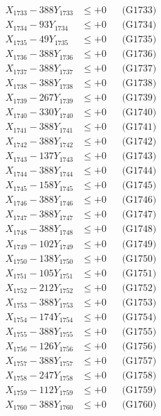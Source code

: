 \documentclass[a4paper,10pt]{article}
\begin{document}
{\begin{align}
X_{1733} - 388Y_{1733} &\leq +0 && \text{(G1733)} \\
X_{1734} - 93Y_{1734} &\leq +0 && \text{(G1734)} \\
X_{1735} - 49Y_{1735} &\leq +0 && \text{(G1735)} \\
X_{1736} - 388Y_{1736} &\leq +0 && \text{(G1736)} \\
X_{1737} - 388Y_{1737} &\leq +0 && \text{(G1737)} \\
X_{1738} - 388Y_{1738} &\leq +0 && \text{(G1738)} \\
X_{1739} - 267Y_{1739} &\leq +0 && \text{(G1739)} \\
X_{1740} - 330Y_{1740} &\leq +0 && \text{(G1740)} \\
\allowbreak
X_{1741} - 388Y_{1741} &\leq +0 && \text{(G1741)} \\
X_{1742} - 388Y_{1742} &\leq +0 && \text{(G1742)} \\
X_{1743} - 137Y_{1743} &\leq +0 && \text{(G1743)} \\
X_{1744} - 388Y_{1744} &\leq +0 && \text{(G1744)} \\
X_{1745} - 158Y_{1745} &\leq +0 && \text{(G1745)} \\
X_{1746} - 388Y_{1746} &\leq +0 && \text{(G1746)} \\
X_{1747} - 388Y_{1747} &\leq +0 && \text{(G1747)} \\
X_{1748} - 388Y_{1748} &\leq +0 && \text{(G1748)} \\
X_{1749} - 102Y_{1749} &\leq +0 && \text{(G1749)} \\
X_{1750} - 138Y_{1750} &\leq +0 && \text{(G1750)} \\
\allowbreak
X_{1751} - 105Y_{1751} &\leq +0 && \text{(G1751)} \\
X_{1752} - 212Y_{1752} &\leq +0 && \text{(G1752)} \\
X_{1753} - 388Y_{1753} &\leq +0 && \text{(G1753)} \\
X_{1754} - 174Y_{1754} &\leq +0 && \text{(G1754)} \\
X_{1755} - 388Y_{1755} &\leq +0 && \text{(G1755)} \\
X_{1756} - 126Y_{1756} &\leq +0 && \text{(G1756)} \\
X_{1757} - 388Y_{1757} &\leq +0 && \text{(G1757)} \\
X_{1758} - 247Y_{1758} &\leq +0 && \text{(G1758)} \\
X_{1759} - 112Y_{1759} &\leq +0 && \text{(G1759)} \\
X_{1760} - 388Y_{1760} &\leq +0 && \text{(G1760)} \\

\end{align}}
\end{document}
